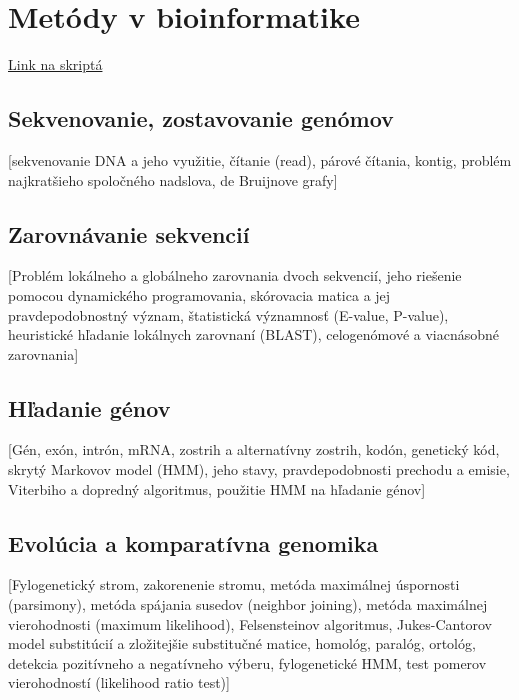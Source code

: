 \chapter[Metódy v bioinformatike]{Metódy v bioinformatike}
\label{metody_v_bioinformatike.tex} %

\href{http://compbio.fmph.uniba.sk/vyuka/mbi/index.php/Predn%C3%A1%C5%A1ky_a_pozn%C3%A1mky}{Link na skriptá}

\section{Sekvenovanie, zostavovanie genómov}

	[sekvenovanie DNA a jeho využitie, čítanie (read), párové čítania, kontig, problém najkratšieho spoločného nadslova, de Bruijnove grafy]

\section{Zarovnávanie sekvencií}

	[Problém lokálneho a globálneho zarovnania dvoch sekvencií, jeho riešenie pomocou dynamického programovania, skórovacia matica a jej pravdepodobnostný význam, štatistická významnosť (E-value, P-value), heuristické hľadanie lokálnych zarovnaní (BLAST), celogenómové a viacnásobné zarovnania]

\section{Hľadanie génov}

	[Gén, exón, intrón, mRNA, zostrih a alternatívny zostrih, kodón, genetický kód, skrytý Markovov model (HMM), jeho stavy, pravdepodobnosti prechodu a emisie, Viterbiho a dopredný algoritmus, použitie HMM na hľadanie génov]

\section{Evolúcia a komparatívna genomika}

	[Fylogenetický strom, zakorenenie stromu, metóda maximálnej úspornosti (parsimony), metóda spájania susedov (neighbor joining), metóda maximálnej vierohodnosti (maximum likelihood), Felsensteinov algoritmus, Jukes-Cantorov model substitúcií a zložitejšie substitučné matice, homológ, paralóg, ortológ, detekcia pozitívneho a negatívneho výberu, fylogenetické HMM, test pomerov vierohodností (likelihood ratio test)]

